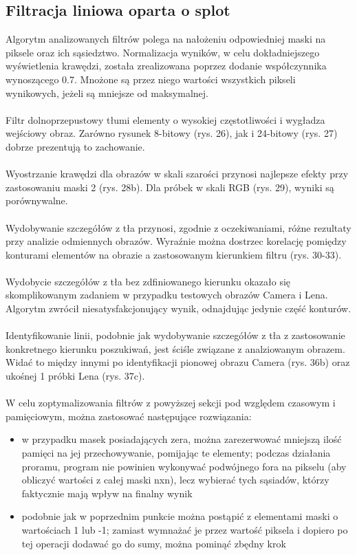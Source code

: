 \documentclass{classrep}
\begin{document}
\subsection{Filtracja liniowa oparta o splot}
Algorytm analizowanych filtrów polega na nałożeniu odpowiedniej maski na piksele oraz ich sąsiedztwo. Normalizacja wyników, w celu dokładniejszego wyświetlenia krawędzi, została zrealizowana poprzez dodanie współczynnika wynoszącego 0.7. Mnożone są przez niego wartości wszystkich pikseli wynikowych, jeżeli są mniejsze od maksymalnej.\\
\\
\indent
Filtr dolnoprzepustowy tłumi elementy o wysokiej częstotliwości i wygładza wejściowy obraz. Zarówno rysunek 8-bitowy (rys. 26), jak i 24-bitowy (rys. 27) dobrze prezentują to zachowanie.\\
\\
\indent
Wyostrzanie krawędzi dla obrazów w skali szarości przynosi najlepsze efekty przy zastosowaniu maski 2 (rys. 28b). Dla próbek w skali RGB (rys. 29), wyniki są porównywalne. \\
\\
\indent
Wydobywanie szczegółów z tła przynosi, zgodnie z oczekiwaniami, różne rezultaty przy analizie odmiennych obrazów. Wyraźnie można dostrzec korelację pomiędzy konturami elementów na obrazie a zastosowanym kierunkiem filtru (rys. 30-33).\\
\\
\indent
Wydobycie szczegółów z tła bez zdfiniowanego kierunku okazało się skomplikowanym zadaniem w przypadku testowych obrazów Camera i Lena. Algorytm zwrócił niesatysfakcjonujący wynik, odnajdując jedynie część konturów.\\
\\
\indent
Identyfikowanie linii, podobnie jak wydobywanie szczegółów z tła z zastosowanie konkretnego kierunku poszukiwań, jest ściśle związane z analziowanym obrazem. Widać to między innymi po identyfikacji pionowej obrazu Camera (rys. 36b) oraz ukośnej 1 próbki Lena (rys. 37c).\\ 
\\
\indent 
W celu zoptymalizowania filtrów z powyższej sekcji pod względem czasowym i pamięciowym, można zastosować następujące rozwiązania:
\begin{itemize}
\item w przypadku masek posiadających zera, można zarezerwować mniejszą ilość pamięci na jej przechowywanie, pomijając te elementy; podczas działania proramu, program nie powinien wykonywać podwójnego fora na pikselu (aby obliczyć wartości z całej maski nxn), lecz wybierać tych sąsiadów, którzy faktycznie mają wpływ na finalny wynik
\item podobnie jak w poprzednim punkcie można postąpić z elementami maski o wartościach 1 lub -1; zamiast wymnażać je przez wartość piksela i dopiero po tej operacji dodawać go do sumy, można pominąć zbędny krok  
\end{itemize}
\end{document}
